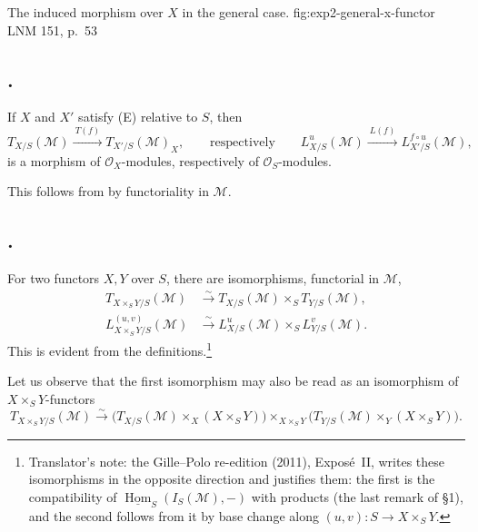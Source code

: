   {The induced morphism over \(X\) in the general case.}
  {fig:exp2-general-x-functor}
  {LNM 151, p.~53}

\subsection*{.}
If \(X\) and \(X'\) satisfy
(E) relative to \(S\), then
\[
  T_{X/S}(\mathcal M)\xrightarrow{\ T(f)\ }
  T_{X'/S}(\mathcal M)_X,
  \qquad\text{respectively}\qquad
  L^u_{X/S}(\mathcal M)\xrightarrow{\ L(f)\ }
  L^{f\circ u}_{X'/S}(\mathcal M),
\]
is a morphism of \(\mathcal O_X\)-modules, respectively of
\(\mathcal O_S\)-modules.

This follows from  by functoriality in \(\mathcal M\).

\subsection*{.}
For two functors \(X,Y\) over \(S\), there are isomorphisms, functorial in
\(\mathcal M\),
\[
\begin{aligned}
  T_{X\times_SY/S}(\mathcal M)
    &\xrightarrow{\sim}T_{X/S}(\mathcal M)\times_ST_{Y/S}(\mathcal M),\\
  L^{(u,v)}_{X\times_SY/S}(\mathcal M)
    &\xrightarrow{\sim}L^u_{X/S}(\mathcal M)\times_SL^v_{Y/S}(\mathcal M).
\end{aligned}
\]
This is evident from the definitions.\footnote{Translator's note: the
Gille--Polo re-edition (2011), Expos\'e~II, writes these isomorphisms in the
opposite direction and justifies them: the first is the compatibility of
\(\underline{\operatorname{Hom}}_S(I_S(\mathcal M),-)\) with products (the
last remark of \S1), and the second follows from it by base change along
\((u,v)\colon S\to X\times_SY\).}

%
Let us observe that the first isomorphism may also be read as an
isomorphism of \(X\times_SY\)-functors
\[
  T_{X\times_SY/S}(\mathcal M)
  \xrightarrow{\sim}
  \bigl(T_{X/S}(\mathcal M)\times_X(X\times_SY)\bigr)
  \mathop{\times}_{X\times_SY}
  \bigl(T_{Y/S}(\mathcal M)\times_Y(X\times_SY)\bigr).
\]

